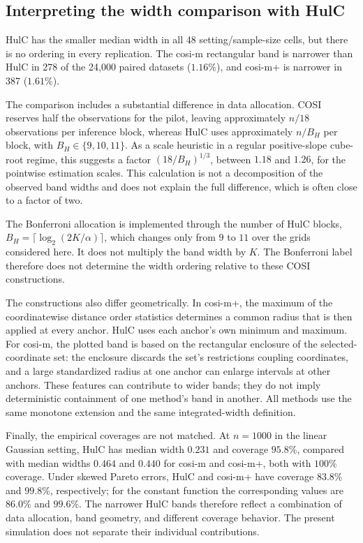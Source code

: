\documentclass[10pt]{article}
\begin{document}
\subsection{Interpreting the width comparison with HulC}
HulC has the smaller median width in all 48 setting/sample-size cells,
but there is no ordering in every replication. The cosi-m rectangular
band is narrower than HulC in 278 of the 24,000 paired datasets
($1.16\%$), and cosi-m+ is narrower in 387 ($1.61\%$).

The comparison includes a substantial difference in data allocation.
COSI reserves half the observations for the pilot, leaving approximately
$n/18$ observations per inference block, whereas HulC uses approximately
$n/B_H$ per block, with $B_H\in\{9,10,11\}$. As a scale heuristic in
a regular positive-slope cube-root regime, this suggests a factor
$(18/B_H)^{1/3}$, between $1.18$ and $1.26$, for the pointwise estimation
scales. This calculation is not a decomposition of the observed band
widths and does not explain the full difference, which is often close to
a factor of two.

The Bonferroni allocation is implemented through the number of HulC
blocks, $B_H=\lceil\log_2(2K/\alpha)\rceil$, which changes only from
$9$ to $11$ over the grids considered here. It does not multiply the
band width by $K$. The Bonferroni label therefore does not determine
the width ordering relative to these COSI constructions.

The constructions also differ geometrically. In cosi-m+, the maximum of
the coordinatewise distance order statistics determines a common radius that is
then applied at every anchor. HulC uses each anchor's own minimum and
maximum. For cosi-m, the plotted band is based on the rectangular
enclosure of the selected-coordinate set: the enclosure discards the
set's restrictions coupling coordinates, and a large standardized radius
at one anchor can enlarge intervals at other anchors. These features can
contribute to wider bands; they do not imply deterministic containment
of one method's band in another. All methods use the same monotone
extension and the same integrated-width definition.

Finally, the empirical coverages are not matched. At $n=1000$ in the
linear Gaussian setting, HulC has median width $0.231$ and coverage
$95.8\%$, compared with median widths $0.464$ and $0.440$ for cosi-m
and cosi-m+, both with $100\%$ coverage. Under skewed Pareto errors,
HulC and cosi-m+ have coverage $83.8\%$ and $99.8\%$, respectively;
for the constant function the corresponding values are $86.0\%$ and
$99.6\%$. The narrower HulC bands therefore reflect a combination of
data allocation, band geometry, and different coverage behavior. The
present simulation does not separate their individual contributions.
\end{document}
